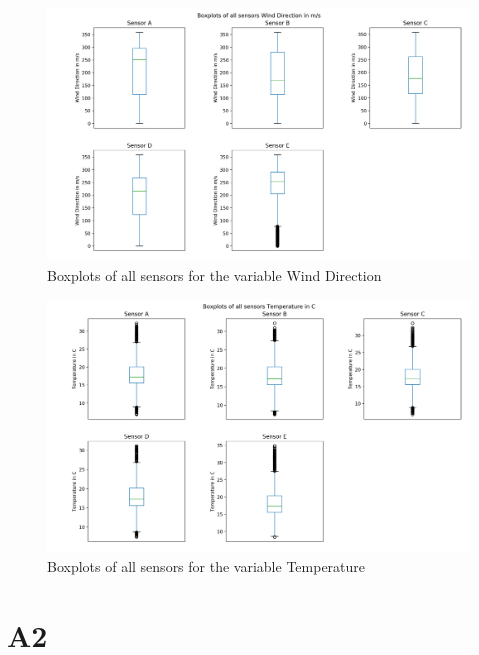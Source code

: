 \documentclass{article}
\begin{document}
        \begin{figure}
            \includegraphics[width=\textwidth]{boxplot_winddirection}
            \caption{Boxplots of all sensors for the variable Wind Direction}
        \end{figure}
        
        \begin{figure}
            \includegraphics[width=\textwidth]{boxplot_temperature}
            \caption{Boxplots of all sensors for the variable Temperature}
        \end{figure}
        

\section{A2}
\end{document}
